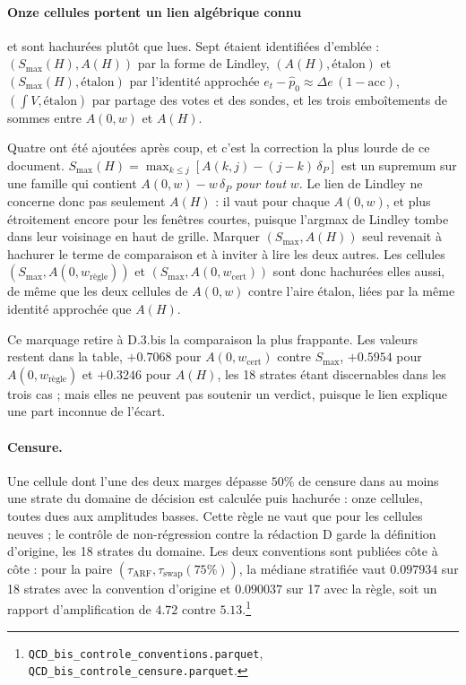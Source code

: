 \documentclass[11pt,a4paper]{article}
\begin{document}
\paragraph{Onze cellules portent un lien algébrique connu} et sont hachurées plutôt que lues.
Sept étaient identifiées d'emblée : $(S_{\max}(H), A(H))$ par la forme de Lindley,
$(A(H), \text{étalon})$ et $(S_{\max}(H), \text{étalon})$ par l'identité approchée
$e_t - \hat{p}_0 \approx \Delta e\,(1 - \mathrm{acc})$, $(\int V, \text{étalon})$ par partage
des votes et des sondes, et les trois emboîtements de sommes entre $A(0,w)$ et $A(H)$.

Quatre ont été ajoutées après coup, et c'est la correction la plus lourde de ce document.
$S_{\max}(H) = \max_{k \leq j} [A(k,j) - (j-k)\,\delta_P]$ est un supremum sur une famille
qui contient $A(0,w) - w\,\delta_P$ \emph{pour tout} $w$. Le lien de Lindley ne concerne donc
pas seulement $A(H)$ : il vaut pour chaque $A(0,w)$, et plus étroitement encore pour les
fenêtres courtes, puisque l'argmax de Lindley tombe dans leur voisinage en haut de grille.
Marquer $(S_{\max}, A(H))$ seul revenait à hachurer le terme de comparaison et à inviter à
lire les deux autres. Les cellules $(S_{\max}, A(0,w_{\text{règle}}))$ et
$(S_{\max}, A(0,w_{\mathrm{cert}}))$ sont donc hachurées elles aussi, de même que les deux
cellules de $A(0,w)$ contre l'aire étalon, liées par la même identité approchée que $A(H)$.

Ce marquage retire à D.3.bis la comparaison la plus frappante. Les valeurs restent dans la
table, $+0.7068$ pour $A(0,w_{\mathrm{cert}})$ contre $S_{\max}$, $+0.5954$ pour
$A(0,w_{\text{règle}})$ et $+0.3246$ pour $A(H)$, les 18 strates étant discernables dans les
trois cas ; mais elles ne peuvent pas soutenir un verdict, puisque le lien explique une part
inconnue de l'écart.

\paragraph{Censure.} Une cellule dont l'une des deux marges dépasse $50\%$ de censure dans au
moins une strate du domaine de décision est calculée puis hachurée : onze cellules, toutes
dues aux amplitudes basses. Cette règle ne vaut que pour les cellules neuves ; le contrôle de
non-régression contre la rédaction D garde la définition d'origine, les 18 strates du domaine.
Les deux conventions sont publiées côte à côte : pour la paire
$(\tau_{\mathrm{ARF}}, \tau_{\mathrm{swap}}(75\%))$, la médiane stratifiée vaut $0.097934$ sur
18 strates avec la convention d'origine et $0.090037$ sur 17 avec la règle, soit un rapport
d'amplification de $4.72$ contre
$5.13$.\footnote{\texttt{QCD\_bis\_controle\_conventions.parquet},
\texttt{QCD\_bis\_controle\_censure.parquet}.}
\end{document}
